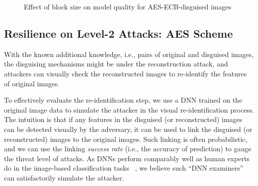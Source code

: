 \documentclass[conference]{IEEEtran}
\begin{document}
\begin{figure}[h]
{
 }
        \caption{Effect of block size on model quality for AES-ECB-disguised images}
        \label{fig:blocksize_aes}
\end{figure}


\subsection{Resilience on Level-2 Attacks: AES Scheme}

With the known additional knowledge, i.e., pairs of original and disguised images, the disguising mechanisms might be under the reconstruction attack, and attackers can visually check the reconstructed images to re-identify the features of original images. %

To effectively evaluate the re-identification step, we use a DNN trained on the original image data to simulate the attacker in the visual re-identification process. The intuition is that if any features in the disguised (or reconstructed) images can be detected visually by the adversary, it can be used to link the disguised (or reconstructed) images to the original images. Such linking is often probabilistic, and we can use the linking \emph{success rate} (i.e., the accuracy of prediction) to gauge the threat level of attacks. As DNNs perform comparably well as human experts do in the image-based classification tasks ~\cite{krizhevsky17}, we believe such ``DNN examiners'' can satisfactorily simulate the attacker.  
\end{document}
